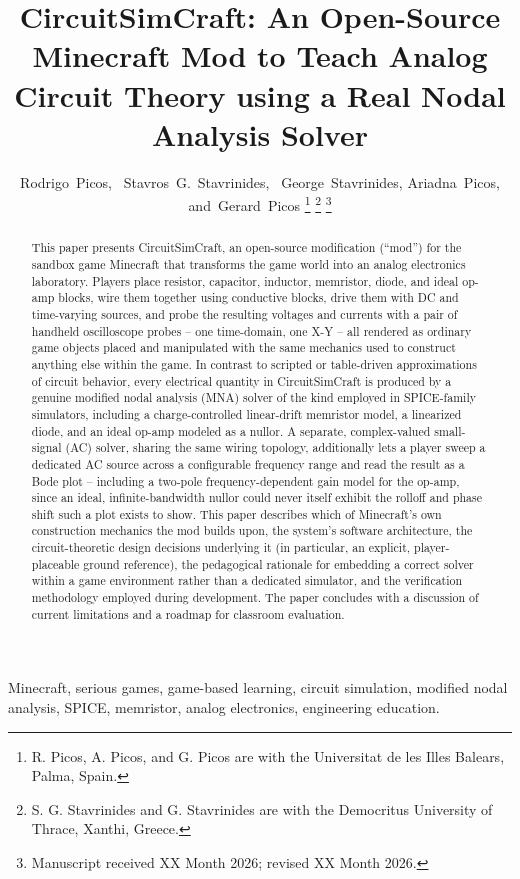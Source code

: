 \documentclass[journal]{IEEEtran}
\title{CircuitSimCraft: An Open-Source Minecraft Mod to Teach Analog Circuit Theory using a Real Nodal Analysis Solver}
\author{Rodrigo~Picos,~\IEEEmembership{Senior~Member,~IEEE,}
        Stavros~G.~Stavrinides,~\IEEEmembership{Senior~Member,~IEEE,}
        George~Stavrinides, Ariadna~Picos, and~Gerard~Picos%
\thanks{R. Picos, A. Picos, and G. Picos are with the Universitat de les Illes Balears, Palma, Spain.}%
\thanks{S. G. Stavrinides and G. Stavrinides are with the Democritus University of Thrace, Xanthi, Greece.}%
\thanks{Manuscript received XX Month 2026; revised XX Month 2026.}}
\begin{document}
\maketitle

\begin{abstract}
This paper presents CircuitSimCraft, an open-source modification (``mod'') for the sandbox
game Minecraft that transforms the game world into an analog electronics laboratory. Players
place resistor, capacitor, inductor, memristor, diode, and ideal op-amp blocks, wire them
together using conductive blocks, drive them with DC and time-varying sources, and probe the
resulting voltages and currents with a pair of handheld oscilloscope probes -- one
time-domain, one X-Y -- all rendered as ordinary game objects placed and manipulated with the
same mechanics used to construct anything else within the game. In contrast to scripted or
table-driven approximations of circuit behavior, every electrical quantity in CircuitSimCraft
is produced by a genuine modified nodal analysis (MNA) solver of the kind
employed in SPICE-family simulators, including a charge-controlled linear-drift memristor
model, a linearized diode, and an ideal op-amp modeled as a nullor. A separate, complex-valued
small-signal (AC) solver, sharing the same wiring topology, additionally lets a player sweep a
dedicated AC source across a configurable frequency range and read the result as a Bode plot --
including a two-pole frequency-dependent gain model for the op-amp, since an ideal, infinite-bandwidth
nullor could never itself exhibit the rolloff and phase shift such a plot exists to show. This
paper describes
which of Minecraft's own construction
mechanics the mod builds upon, the system's software architecture, the circuit-theoretic
design decisions underlying it (in particular, an explicit, player-placeable ground
reference), the pedagogical rationale for embedding a correct solver within a game
environment rather than a dedicated simulator, and the verification methodology employed
during development. The paper concludes with a discussion of current limitations and a
roadmap for classroom evaluation.
\end{abstract}

\begin{IEEEkeywords}
Minecraft, serious games, game-based learning, circuit simulation, modified nodal analysis,
SPICE, memristor, analog electronics, engineering education.
\end{IEEEkeywords}

\IEEEpeerreviewmaketitle



















\end{document}
